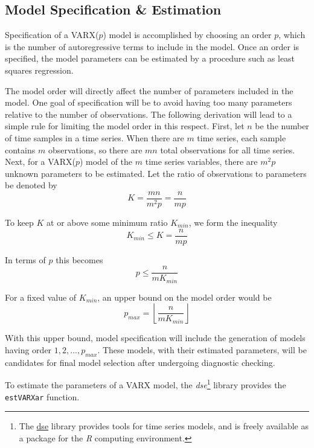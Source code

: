 \documentclass[a4paper]{scrartcl}
\begin{document}
\subsection*{Model Specification \& Estimation}
Specification of a VARX($p$) model is accomplished by choosing an order $p$, which is the number of autoregressive terms to include in the model. Once an order is specified, the model parameters can be estimated by a procedure such as least squares regression.  

The model order will directly affect the number of parameters included in the model. One goal of specification will be to avoid having too many parameters relative to the number of observations. The following derivation will lead to a simple rule for limiting the model order in this respect. First, let $n$ be the number of time samples in a time series. When there are $m$ time series, each sample contains $m$ observations, so there are $m n$ total observations for all time series. Next, for a VARX($p$) model of the $m$ time series variables, there are $m^2 p$ unknown parameters to be estimated. Let the ratio of observations to parameters be denoted by
\begin{equation}
K = \frac{m n}{m^2 p} = \frac{n}{m p}
\end{equation}

To keep $K$ at or above some minimum ratio $K_{min}$, we form the inequality
\begin{equation}
K_{min} \leq K = \frac{n}{m p}
\end{equation}

In terms of $p$ this becomes
\begin{equation}
p \le \frac{n}{m K_{min}}
\end{equation}

For a fixed value of $K_{min}$, an upper bound on the model order would be
\begin{equation}
p_{max} = \left \lfloor \frac{n}{m K_{min}} \right \rfloor
\end{equation}

With this upper bound, model specification will include the generation of models having order $1, 2,..., p_{max}$. These models, with their estimated parameters, will be candidates for final model selection after undergoing diagnostic checking.

To estimate the parameters of a VARX model, the \textit{dse}\footnote{The \href{http://cran.r-project.org/web/packages/dse}{dse} library provides tools for time series models, and is freely available as a package for the \textit{R} computing environment.} library provides the \texttt{estVARXar} function.
\end{document}
